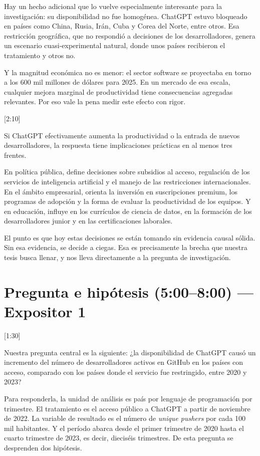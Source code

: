 \documentclass[11pt,a4paper]{article}
\newcommand{\slide}[2]{\par\vspace{0.6em}\noindent{\bfseries\color{pucpaccent}\rule[0.1em]{0.45em}{0.45em}\ #1}\hfill{\small\color{graysoft}[#2]}\par\vspace{0.2em}}
\begin{document}
Hay un hecho adicional que lo vuelve especialmente interesante para la investigación: su disponibilidad no fue homogénea. ChatGPT estuvo bloqueado en países como China, Rusia, Irán, Cuba y Corea del Norte, entre otros. Esa restricción geográfica, que no respondió a decisiones de los desarrolladores, genera un escenario cuasi-experimental natural, donde unos países recibieron el tratamiento y otros no.

Y la magnitud económica no es menor: el sector software se proyectaba en torno a los 600 mil millones de dólares para 2025. En un mercado de esa escala, cualquier mejora marginal de productividad tiene consecuencias agregadas relevantes. Por eso vale la pena medir este efecto con rigor.

\slide{¿Por qué importa?}{2:10}
Si ChatGPT efectivamente aumenta la productividad o la entrada de nuevos desarrolladores, la respuesta tiene implicaciones prácticas en al menos tres frentes.

En política pública, define decisiones sobre subsidios al acceso, regulación de los servicios de inteligencia artificial y el manejo de las restricciones internacionales. En el ámbito empresarial, orienta la inversión en suscripciones premium, los programas de adopción y la forma de evaluar la productividad de los equipos. Y en educación, influye en los currículos de ciencia de datos, en la formación de los desarrolladores junior y en las certificaciones laborales.

El punto es que hoy estas decisiones se están tomando sin evidencia causal sólida. Sin esa evidencia, se decide a ciegas. Esa es precisamente la brecha que nuestra tesis busca llenar, y nos lleva directamente a la pregunta de investigación.

\section{Pregunta e hipótesis \hfill {\normalfont\small\color{graysoft}(5:00--8:00) — Expositor 1}}

\slide{Pregunta de investigación}{1:30}
Nuestra pregunta central es la siguiente: ¿la disponibilidad de ChatGPT causó un incremento del número de desarrolladores activos en GitHub en los países con acceso, comparado con los países donde el servicio fue restringido, entre 2020 y 2023?

Para responderla, la unidad de análisis es país por lenguaje de programación por trimestre. El tratamiento es el acceso público a ChatGPT a partir de noviembre de 2022. La variable de resultado es el número de \textit{unique pushers} por cada 100 mil habitantes. Y el período abarca desde el primer trimestre de 2020 hasta el cuarto trimestre de 2023, es decir, dieciséis trimestres. De esta pregunta se desprenden dos hipótesis.
\end{document}
